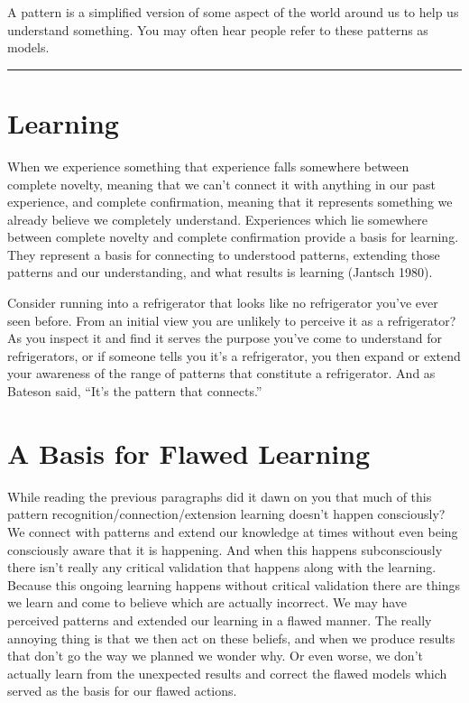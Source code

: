\documentclass[]{memoir}
\begin{document}
A pattern is a simplified version of some aspect of the world around us
to help us understand something. You may often hear people refer to
these patterns as models.

\begin{center}\rule{3in}{0.4pt}\end{center}

\section{Learning}

When we experience something that experience falls somewhere between
complete novelty, meaning that we can't connect it with anything in our
past experience, and complete confirmation, meaning that it represents
something we already believe we completely understand. Experiences which
lie somewhere between complete novelty and complete confirmation provide
a basis for learning. They represent a basis for connecting to
understood patterns, extending those patterns and our understanding, and
what results is learning (Jantsch 1980).

Consider running into a refrigerator that looks like no refrigerator
you've ever seen before. From an initial view you are unlikely to
perceive it as a refrigerator? As you inspect it and find it serves the
purpose you've come to understand for refrigerators, or if someone tells
you it's a refrigerator, you then expand or extend your awareness of the
range of patterns that constitute a refrigerator. And as Bateson said,
``It's the pattern that connects.''

\section{A Basis for Flawed Learning}

While reading the previous paragraphs did it dawn on you that much of
this pattern recognition/connection/extension learning doesn't happen
consciously? We connect with patterns and extend our knowledge at times
without even being consciously aware that it is happening. And when this
happens subconsciously there isn't really any critical validation that
happens along with the learning. Because this ongoing learning happens
without critical validation there are things we learn and come to
believe which are actually incorrect. We may have perceived patterns and
extended our learning in a flawed manner. The really annoying thing is
that we then act on these beliefs, and when we produce results that
don't go the way we planned we wonder why. Or even worse, we don't
actually learn from the unexpected results and correct the flawed models
which served as the basis for our flawed actions.
\end{document}
